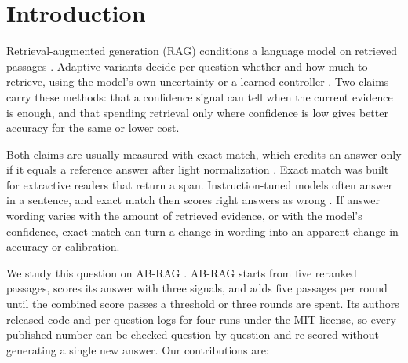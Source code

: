 \documentclass[11pt]{article}
\begin{document}
\section{Introduction}

Retrieval-augmented generation (RAG) conditions a language model on retrieved passages \citep{lewis2020rag}. Adaptive variants decide per question whether and how much to retrieve, using the model's own uncertainty or a learned controller \citep{jiang2023flare,asai2024selfrag,jeong2024adaptiverag,su2024dragin,mallen2023when}. Two claims carry these methods: that a confidence signal can tell when the current evidence is enough, and that spending retrieval only where confidence is low gives better accuracy for the same or lower cost.

Both claims are usually measured with exact match, which credits an answer only if it equals a reference answer after light normalization \citep{rajpurkar2016squad}. Exact match was built for extractive readers that return a span. Instruction-tuned models often answer in a sentence, and exact match then scores right answers as wrong \citep{kamalloo2023evaluating}. If answer wording varies with the amount of retrieved evidence, or with the model's confidence, exact match can turn a change in wording into an apparent change in accuracy or calibration.

We study this question on AB-RAG \citep{kamthan2026abrag}. AB-RAG starts from five reranked passages, scores its answer with three signals, and adds five passages per round until the combined score passes a threshold or three rounds are spent. Its authors released code and per-question logs for four runs under the MIT license, so every published number can be checked question by question and re-scored without generating a single new answer. Our contributions are:
\end{document}
